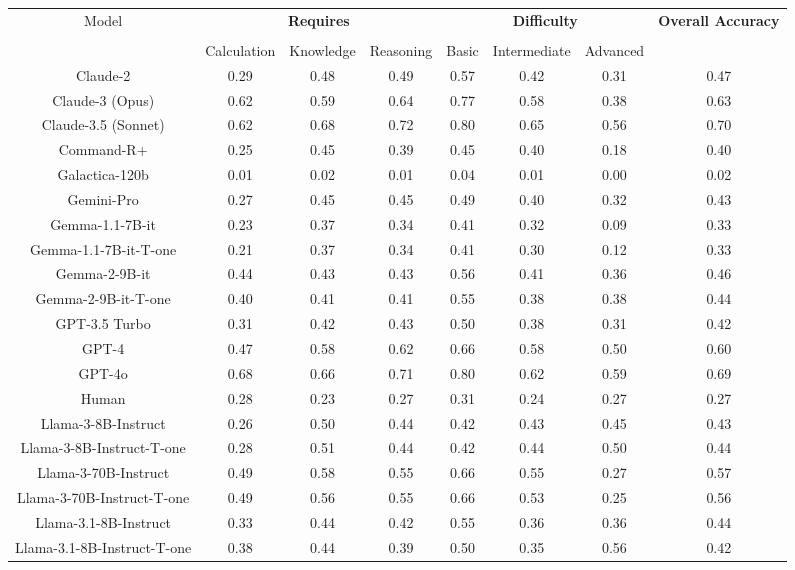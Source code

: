 \begin{tabular}{cccccccc}
\toprule
\multirow{3}{*}{Model} & \multicolumn{3}{c}{\textbf{Requires}} & \multicolumn{3}{c}{\textbf{Difficulty}} & \multirow{3}{*}{\textbf{Overall Accuracy}}\\\cmidrule(lr){2-4} \cmidrule(lr){5-7}\\
 & Calculation & Knowledge & Reasoning & Basic & Intermediate & Advanced &  \\
\midrule
Claude-2 & 0.29 & 0.48 & 0.49 & 0.57 & 0.42 & 0.31 & 0.47 \\
Claude-3 (Opus) & 0.62 & 0.59 & 0.64 & 0.77 & 0.58 & 0.38 & 0.63 \\
Claude-3.5 (Sonnet) & 0.62 & 0.68 & 0.72 & 0.80 & 0.65 & 0.56 & 0.70 \\
Command-R+ & 0.25 & 0.45 & 0.39 & 0.45 & 0.40 & 0.18 & 0.40 \\
Galactica-120b & 0.01 & 0.02 & 0.01 & 0.04 & 0.01 & 0.00 & 0.02 \\
Gemini-Pro & 0.27 & 0.45 & 0.45 & 0.49 & 0.40 & 0.32 & 0.43 \\
Gemma-1.1-7B-it & 0.23 & 0.37 & 0.34 & 0.41 & 0.32 & 0.09 & 0.33 \\
Gemma-1.1-7B-it-T-one & 0.21 & 0.37 & 0.34 & 0.41 & 0.30 & 0.12 & 0.33 \\
Gemma-2-9B-it & 0.44 & 0.43 & 0.43 & 0.56 & 0.41 & 0.36 & 0.46 \\
Gemma-2-9B-it-T-one & 0.40 & 0.41 & 0.41 & 0.55 & 0.38 & 0.38 & 0.44 \\
GPT-3.5 Turbo & 0.31 & 0.42 & 0.43 & 0.50 & 0.38 & 0.31 & 0.42 \\
GPT-4 & 0.47 & 0.58 & 0.62 & 0.66 & 0.58 & 0.50 & 0.60 \\
GPT-4o & 0.68 & 0.66 & 0.71 & 0.80 & 0.62 & 0.59 & 0.69 \\
Human & 0.28 & 0.23 & 0.27 & 0.31 & 0.24 & 0.27 & 0.27 \\
Llama-3-8B-Instruct & 0.26 & 0.50 & 0.44 & 0.42 & 0.43 & 0.45 & 0.43 \\
Llama-3-8B-Instruct-T-one & 0.28 & 0.51 & 0.44 & 0.42 & 0.44 & 0.50 & 0.44 \\
Llama-3-70B-Instruct & 0.49 & 0.58 & 0.55 & 0.66 & 0.55 & 0.27 & 0.57 \\
Llama-3-70B-Instruct-T-one & 0.49 & 0.56 & 0.55 & 0.66 & 0.53 & 0.25 & 0.56 \\
Llama-3.1-8B-Instruct & 0.33 & 0.44 & 0.42 & 0.55 & 0.36 & 0.36 & 0.44 \\
Llama-3.1-8B-Instruct-T-one & 0.38 & 0.44 & 0.39 & 0.50 & 0.35 & 0.56 & 0.42 \\

\end{tabular}
